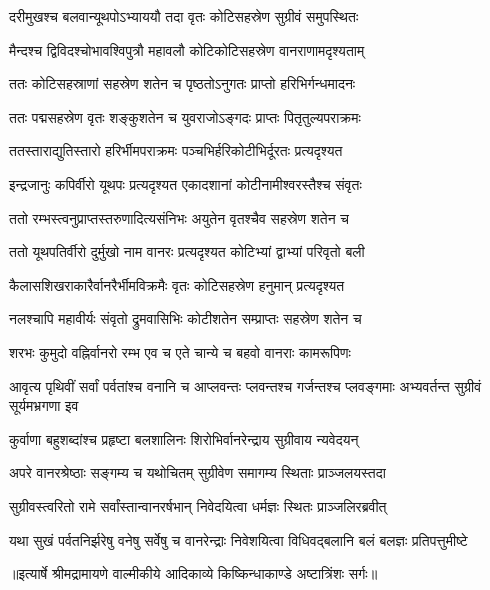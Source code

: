 \twolineshloka
{दरीमुखश्च बलवान्यूथपोऽभ्याययौ तदा}
{वृतः कोटिसहस्रेण सुग्रीवं समुपस्थितः} %

\twolineshloka
{मैन्दश्च द्विविदश्चोभावश्विपुत्रौ महावलौ}
{कोटिकोटिसहस्रेण वानराणामदृश्यताम्} %

\twolineshloka
{ततः कोटिसहस्राणां सहस्रेण शतेन च}
{पृष्ठतोऽनुगतः प्राप्तो हरिभिर्गन्धमादनः} %

\twolineshloka
{ततः पद्मसहस्रेण वृतः शङ्कुशतेन च}
{युवराजोऽङ्गदः प्राप्तः पितृतुल्यपराक्रमः} %

\twolineshloka
{ततस्ताराद्युतिस्तारो हरिर्भीमपराक्रमः}
{पञ्चभिर्हरिकोटीभिर्दूरतः प्रत्यदृश्यत} %

\twolineshloka
{इन्द्रजानुः कपिर्वीरो यूथपः प्रत्यदृश्यत}
{एकादशानां कोटीनामीश्वरस्तैश्च संवृतः} %

\twolineshloka
{ततो रम्भस्त्वनुप्राप्तस्तरुणादित्यसंनिभः}
{अयुतेन वृतश्चैव सहस्रेण शतेन च} %

\twolineshloka
{ततो यूथपतिर्वीरो दुर्मुखो नाम वानरः}
{प्रत्यदृश्यत कोटिभ्यां द्वाभ्यां परिवृतो बली} %

\twolineshloka
{कैलासशिखराकारैर्वानरैर्भीमविक्रमैः}
{वृतः कोटिसहस्रेण हनुमान् प्रत्यदृश्यत} %

\twolineshloka
{नलश्चापि महावीर्यः संवृतो द्रुमवासिभिः}
{कोटीशतेन सम्प्राप्तः सहस्रेण शतेन च} %

\twolineshloka
{शरभः कुमुदो वह्निर्वानरो रम्भ एव च}
{एते चान्ये च बहवो वानराः कामरूपिणः} %

\threelineshloka
{आवृत्य पृथिवीं सर्वां पर्वतांश्च वनानि च}
{आप्लवन्तः प्लवन्तश्च गर्जन्तश्च प्लवङ्गमाः}
{अभ्यवर्तन्त सुग्रीवं सूर्यमभ्रगणा इव} %

\twolineshloka
{कुर्वाणा बहुशब्दांश्च प्रहृष्टा बलशालिनः}
{शिरोभिर्वानरेन्द्राय सुग्रीवाय न्यवेदयन्} %

\twolineshloka
{अपरे वानरश्रेष्ठाः सङ्गम्य च यथोचितम्}
{सुग्रीवेण समागम्य स्थिताः प्राञ्जलयस्तदा} %

\twolineshloka
{सुग्रीवस्त्वरितो रामे सर्वांस्तान्वानरर्षभान्}
{निवेदयित्वा धर्मज्ञः स्थितः प्राञ्जलिरब्रवीत्} %

\fourlineindentedshloka
{यथा सुखं पर्वतनिर्झरेषु}
{वनेषु सर्वेषु च वानरेन्द्राः}
{निवेशयित्वा विधिवद्बलानि}
{बलं बलज्ञः प्रतिपत्तुमीष्टे} %


{॥इत्यार्षे श्रीमद्रामायणे वाल्मीकीये आदिकाव्ये किष्किन्धाकाण्डे अष्टात्रिंशः सर्गः॥}

